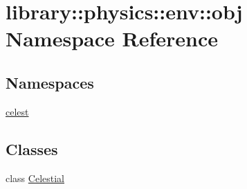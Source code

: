 \hypertarget{namespacelibrary_1_1physics_1_1env_1_1obj}{}\section{library\+:\+:physics\+:\+:env\+:\+:obj Namespace Reference}
\label{namespacelibrary_1_1physics_1_1env_1_1obj}
\subsection*{Namespaces}
\begin{DoxyCompactItemize}
\item 
 \hyperlink{namespacelibrary_1_1physics_1_1env_1_1obj_1_1celest}{celest}
\end{DoxyCompactItemize}
\subsection*{Classes}
\begin{DoxyCompactItemize}
\item 
class \hyperlink{classlibrary_1_1physics_1_1env_1_1obj_1_1_celestial}{Celestial}
\end{DoxyCompactItemize}
